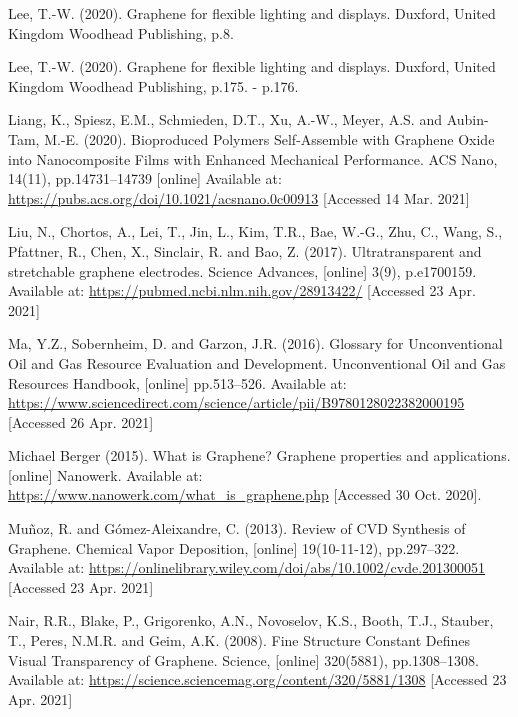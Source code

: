 \documentclass[a4paper,12pt]{article}
\numberwithin{equation}{section}
\numberwithin{figure}{section}
\begin{document}
\noindent Lee, T.-W. (2020). Graphene for flexible lighting and displays. Duxford, United Kingdom Woodhead Publishing, p.8.\vspace{\baselineskip}

\noindent Lee, T.-W. (2020). Graphene for flexible lighting and displays. Duxford, United Kingdom Woodhead Publishing, p.175. - p.176.\vspace{\baselineskip}

\noindent Liang, K., Spiesz, E.M., Schmieden, D.T., Xu, A.-W., Meyer, A.S. and Aubin-Tam, M.-E. (2020). Bioproduced Polymers Self-Assemble with Graphene Oxide into Nanocomposite Films with Enhanced Mechanical Performance. ACS Nano, 14(11), pp.14731–14739 [online] Available at: \url{https://pubs.acs.org/doi/10.1021/acsnano.0c00913} [Accessed 14 Mar. 2021]\vspace{\baselineskip}

\noindent Liu, N., Chortos, A., Lei, T., Jin, L., Kim, T.R., Bae, W.-G., Zhu, C., Wang, S., Pfattner, R., Chen, X., Sinclair, R. and Bao, Z. (2017). Ultratransparent and stretchable graphene electrodes. Science Advances, [online] 3(9), p.e1700159. Available at: \url{https://pubmed.ncbi.nlm.nih.gov/28913422/} [Accessed 23 Apr. 2021]\vspace{\baselineskip}

\noindent Ma, Y.Z., Sobernheim, D. and Garzon, J.R. (2016). Glossary for Unconventional Oil and Gas Resource Evaluation and Development. Unconventional Oil and Gas Resources Handbook, [online] pp.513–526. Available at: \url{https://www.sciencedirect.com/science/article/pii/B9780128022382000195} [Accessed 26 Apr. 2021]\vspace{\baselineskip}

\noindent Michael Berger (2015). What is Graphene? Graphene properties and applications. [online] Nanowerk. Available at: \url{https://www.nanowerk.com/what\_is\_graphene.php} [Accessed 30 Oct. 2020].\vspace{\baselineskip}

\noindent Muñoz, R. and Gómez-Aleixandre, C. (2013). Review of CVD Synthesis of Graphene. Chemical Vapor Deposition, [online] 19(10-11-12), pp.297–322. Available at: \url{https://onlinelibrary.wiley.com/doi/abs/10.1002/cvde.201300051} [Accessed 23 Apr. 2021]\vspace{\baselineskip}

\noindent Nair, R.R., Blake, P., Grigorenko, A.N., Novoselov, K.S., Booth, T.J., Stauber, T., Peres, N.M.R. and Geim, A.K. (2008). Fine Structure Constant Defines Visual Transparency of Graphene. Science, [online] 320(5881), pp.1308–1308. Available at: \url{https://science.sciencemag.org/content/320/5881/1308} [Accessed 23 Apr. 2021]\vspace{\baselineskip}
\end{document}

